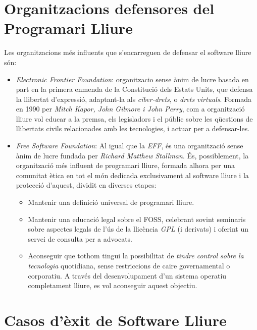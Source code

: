 \section{Organitzacions defensores del Programari Lliure}

Les organitzacions més influents que s'encarreguen de defensar el software lliure són:
 
 \begin{itemize}
\item \emph{Electronic Frontier Foundation}:  organitzacio sense ànim de lucre basada en part en la primera enmenda de la Constitució dels Estats Units, que defensa la llibertat d'expressió, adaptant-la als \emph{ciber-drets}, o \emph{drets virtuals}. Formada en 1990 per \textit{Mitch Kapor, John Gilmore i John Perry}, com a organització lliure vol educar a la premsa, els legisladors i el públic sobre les qüestions de llibertats civils relacionades amb les tecnologies, i actuar per a defensar-les. \cite{OrgDefEFF}
 \cite{OrgDefEFFII}
\item \emph{Free Software Foundation}: Al igual que la \emph{EFF}, és una 		organització sense ànim de lucre fundada per \emph{Richard Matthew Stallman}. És, possiblement, la organització més 		influent de programari lliure, formada alhora per una comunitat ètica en tot el món dedicada 		exclusivament al software lliure i la protecció d'aquest, dividit en diverses etapes:


	\begin{itemize}
	\item Mantenir una definició universal de programari lliure.
	\item Mantenir una educació legal sobre el FOSS, celebrant sovint seminaris sobre aspectes legals de l'ús de la 		llicència \emph{GPL} (i derivats) i oferint un servei de consulta per a advocats.
	\item Aconseguir que tothom tingui la possibilitat de \emph{tindre control sobre la tecnologia} 	quotidiana, sense restriccions de caire governamental o corporatiu. A través del desenvolupament d'un sistema operatiu completament lliure, es vol aconseguir aquest objectiu. \cite{ObjGNU} \cite{OrgDefFSF}
	\end{itemize}

\end{itemize}

\section{Casos d'èxit de Software Lliure}

